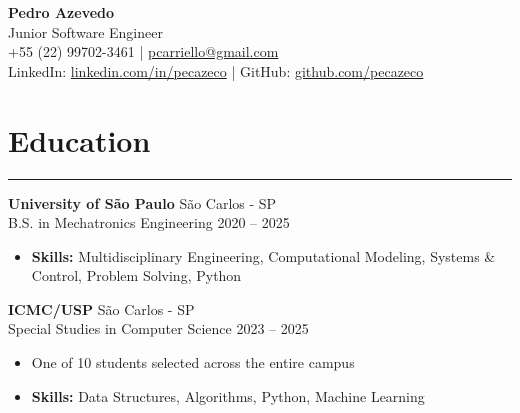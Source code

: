 \documentclass[10pt,a4paper]{article}
\begin{document}
\begin{center}
    {\huge \textbf{Pedro Azevedo}} \\
    Junior Software Engineer \\
    +55 (22) 99702-3461 \quad | \quad \href{mailto:pcarriello@gmail.com}{pcarriello@gmail.com} \\
    LinkedIn: \href{https://www.linkedin.com/in/pecazeco}{linkedin.com/in/pecazeco} \quad | \quad GitHub: \href{https://github.com/pecazeco}{github.com/pecazeco}
\end{center}

\section*{Education}
\hrule \vspace{2mm}
\textbf{University of São Paulo} \hfill São Carlos - SP \\
B.S. in Mechatronics Engineering \hfill 2020 -- 2025
\begin{itemize}[nosep]
    \item \textbf{Skills:} Multidisciplinary Engineering, Computational Modeling, Systems \& Control, Problem Solving, Python
\end{itemize}

\vspace{1mm}
\textbf{ICMC/USP} \hfill São Carlos - SP \\
Special Studies in Computer Science \hfill 2023 -- 2025
\begin{itemize}[nosep]
    \item One of 10 students selected across the entire campus
    \item \textbf{Skills:} Data Structures, Algorithms, Python, Machine Learning
\end{itemize}
\end{document}
